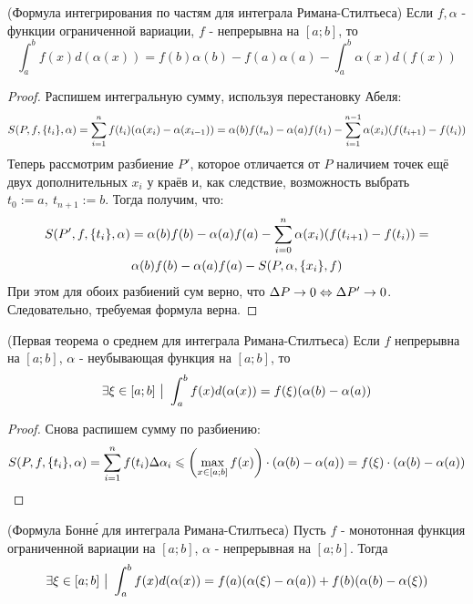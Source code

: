 \begin{theorem} (Формула интегрирования по частям для интеграла Римана-Стилтьеса)
	Если $f, \alpha$ - функции ограниченной вариации, $f$ - непрерывна на $[a; b]$, то
	\[
		\int_a^b f(x)d(\alpha(x)) = f(b)\alpha(b) - f(a)\alpha(a) - \int_a^b \alpha(x)d(f(x))
	\]
\end{theorem}

\begin{proof}
	Распишем интегральную сумму, используя перестановку Абеля:
	\[
		S(P, f, \{t_i\}, \alpha) = \sum\limits_{i=  1}^nf(t_i)(\alpha(x_i) - \alpha(x_{i - 1})) = \alpha(b)f(t_n) - \alpha(a)f(t_1) - \sum\limits_{i = 1}^{n - 1}\alpha(x_i)(f(t_{i + 1}) - f(t_i))
	\]
	Теперь рассмотрим разбиение $P'$, которое отличается от $P$ наличием точек ещё двух дополнительных $x_i$ у краёв и, как следствие, возможность выбрать $t_0 := a,\  t_{n + 1} := b$.
	Тогда получим, что:
	\begin{multline*}
		S(P', f, \{t_i\}, \alpha)  = \alpha(b)f(b) - \alpha(a)f(a) - \sum\limits_{i = 0}^n \alpha(x_i)(f(t_{i + 1}) - f(t_i)) =
		\\
		\alpha(b)f(b) - \alpha(a)f(a) - S(P, \alpha, \{x_i\}, f)
	\end{multline*}
	При этом для обоих разбиений сум верно, что $\Delta P \to 0 \Leftrightarrow \Delta P' \to 0$. Следовательно, требуемая формула верна.
\end{proof}

\begin{theorem} (Первая теорема о среднем для интеграла Римана-Стилтьеса)
	Если $f$ непрерывна на $[a; b]$, $\alpha$ - неубывающая функция на $[a; b]$, то
	\[
		\exists \xi \in [a; b] \ \big|\  \int_a^b f(x) d(\alpha(x)) = f(\xi)(\alpha(b) - \alpha(a))
	\]
\end{theorem}

\begin{proof}
	Снова распишем сумму по разбиению:
	\[
		S(P, f, \{t_i\}, \alpha) = \sum\limits_{i = 1}^n f(t_i) \Delta \alpha_i \leqslant \left(\max\limits_{x \in [a; b]} f(x)\right) \cdot (\alpha(b) - \alpha(a)) = f(\xi) \cdot (\alpha(b) - \alpha(a))
	\]
\end{proof}

\begin{theorem} (Формула Бонн\'{е} для интеграла Римана-Стилтьеса)
	Пусть $f$ - монотонная функция ограниченной вариации на $[a; b]$, $\alpha$ - непрерывная на $[a; b]$. Тогда
	\[
		\exists \xi \in [a; b] \ \big|\  \int_a^b f(x) d(\alpha(x)) = f(a)(\alpha(\xi) - \alpha(a)) + f(b)(\alpha(b) - \alpha(\xi))
	\]
\end{theorem}

